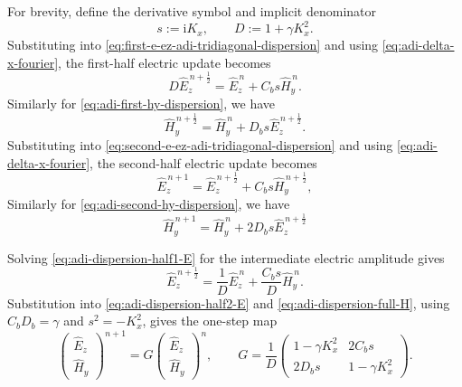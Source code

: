 \documentclass{article}
\numberwithin{equation}{section}
\numberwithin{figure}{section}
\begin{document}
For brevity, define the derivative symbol and implicit denominator
\begin{equation}
    s:=\mathrm{i}K_x,\qquad D:=1+\gamma K_x^2.
    \label{eq:adi-dispersion-s-D}
\end{equation}
Substituting into \eqref{eq:first-e-ez-adi-tridiagonal-dispersion} and using \eqref{eq:adi-delta-x-fourier}, the first-half electric update becomes
\begin{equation}
    D\widehat E_z^{\,n+\frac12} = \widehat E_z^{\,n}+C_bs\widehat H_y^{\,n}.
    \label{eq:adi-dispersion-half1-E}
\end{equation}
Similarly for \eqref{eq:adi-first-hy-dispersion}, we have
\begin{equation}
    \widehat H_y^{\,n+\frac12} = \widehat H_y^{\,n}+D_bs\widehat E_z^{\,n+\frac12}.
    \label{eq:adi-dispersion-half1-H}
\end{equation}
Substituting into \eqref{eq:second-e-ez-adi-tridiagonal-dispersion} and using \eqref{eq:adi-delta-x-fourier}, the second-half electric update becomes
\begin{equation}
    \widehat E_z^{\,n+1} = \widehat E_z^{\,n+\frac12}+C_bs\widehat H_y^{\,n+\frac12},
    \label{eq:adi-dispersion-half2-E}
\end{equation}
Similarly for \eqref{eq:adi-second-hy-dispersion}, we have
\begin{equation}
    \widehat H_y^{\,n+1} = \widehat H_y^{\,n}+2D_bs\widehat E_z^{\,n+\frac12}
    \label{eq:adi-dispersion-full-H}
\end{equation}

Solving \eqref{eq:adi-dispersion-half1-E} for the intermediate electric amplitude gives
\begin{equation}
    \widehat E_z^{\,n+\frac12}=\frac{1}{D}\widehat E_z^{\,n}+\frac{C_bs}{D}\widehat H_y^{\,n}.
\end{equation}
Substitution into \eqref{eq:adi-dispersion-half2-E} and \eqref{eq:adi-dispersion-full-H}, using $C_bD_b=\gamma$ and $s^2=-K_x^2$, gives the one-step map
\begin{equation}
    \begin{pmatrix} \widehat E_z \\ \widehat H_y \end{pmatrix}^{n+1}=G\begin{pmatrix} \widehat E_z \\ \widehat H_y \end{pmatrix}^{n},\qquad G=\frac{1}{D}\begin{pmatrix} 1-\gamma K_x^2 & 2C_b s \\ 2D_b s & 1-\gamma K_x^2 \end{pmatrix}.
    \label{eq:adi-amplification-matrix}
\end{equation}
\end{document}
